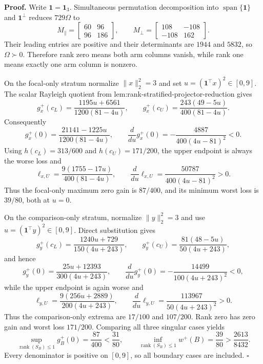 \textbf{Proof.}
Write \(\mathbf1=\mathbf1_3\).  Simultaneous permutation decomposition into \(\operatorname{span}\{\mathbf1\}\) and \(\mathbf1^\perp\) reduces \(729\Omega\) to
\[
 M_\parallel=\begin{bmatrix}60&96\\96&186\end{bmatrix},
 \qquad M_\perp=\begin{bmatrix}108&-108\\-108&162\end{bmatrix}.
\]
Their leading entries are positive and their determinants are \(1944\) and \(5832\), so \(\Omega\succ0\).  Therefore rank zero means both arm columns vanish, while rank one means exactly one arm column is nonzero.

On the focal-only stratum normalize \(\lVert x\rVert_2^2=3\) and set \(u=(\mathbf1^{\top}x)^2\in[0,9]\).  The scalar Rayleigh quotient from lem:rank-stratified-projector-reduction gives
\[
 g_x^+(c_L)=\frac{1195u+6561}{1200(81-4u)},
 \qquad g_x^+(c_U)=\frac{243(49-5u)}{400(81-4u)}.
\]
Consequently
\[
 g_x^+(0)=\frac{21141-1225u}{1200(81-4u)},
 \qquad \frac{d}{du}g_x^+(0)=-\frac{4887}{400(4u-81)^2}<0.
\]
Using \(h(c_L)=313/600\) and \(h(c_U)=171/200\), the upper endpoint is always the worse loss and
\[
 \ell_{x,U}=\frac{9(1755-17u)}{400(81-4u)},
 \qquad \frac{d}{du}\ell_{x,U}=\frac{50787}{400(4u-81)^2}>0.
\]
Thus the focal-only maximum zero gain is \(87/400\), and its minimum worst loss is \(39/80\), both at \(u=0\).

On the comparison-only stratum, normalize \(\lVert y\rVert_2^2=3\) and use \(u=(\mathbf1^{\top}y)^2\in[0,9]\).  Direct substitution gives
\[
 g_y^+(c_L)=\frac{1240u+729}{150(4u+243)},
 \qquad g_y^+(c_U)=\frac{81(48-5u)}{50(4u+243)},
\]
and hence
\[
 g_y^+(0)=\frac{25u+12393}{300(4u+243)},
 \qquad \frac{d}{du}g_y^+(0)=-\frac{14499}{100(4u+243)^2}<0,
\]
while the upper endpoint is again worse and
\[
 \ell_{y,U}=\frac{9(256u+2889)}{200(4u+243)},
 \qquad \frac{d}{du}\ell_{y,U}=\frac{113967}{50(4u+243)^2}>0.
\]
Thus the comparison-only extrema are \(17/100\) and \(107/200\).  Rank zero has zero gain and worst loss \(171/200\).  Comparing all three singular cases yields
\[
 \sup_{\operatorname{rank}(S_B)\le1}g_B^+(0)=\frac{87}{400}<\frac{31}{80},
 \qquad
 \inf_{\operatorname{rank}(S_B)\le1}w^+(B)=\frac{39}{80}>\frac{2613}{8432}.
\]
Every denominator is positive on \([0,9]\), so all boundary cases are included. \(\square\)